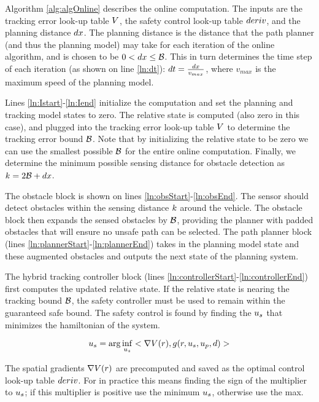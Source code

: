 Algorithm \ref{alg:algOnline} describes the online computation. The inputs are the tracking error look-up table $V$, the safety control look-up table $deriv$, and the planning distance $dx$. The planning distance is the distance that the path planner (and thus the planning model) may take for each iteration of the online algorithm, and is chosen to be $0< dx \leq \mathcal B$. This in turn determines the time step of each iteration (as shown on line \ref{ln:dt}): $dt = \frac{dx}{v_{max}}$, where $v_{max}$ is the maximum speed of the planning model.

Lines \ref{ln:Istart}-\ref{ln:Iend} initialize the computation and set the planning and tracking model states to zero. The relative state is computed (also zero in this case), and plugged into the tracking error look-up table $V$ to determine the tracking error bound $\mathcal B$. Note that by initializing the relative state to be zero we can use the smallest possible $\mathcal B$ for the entire online computation. Finally, we determine the minimum possible sensing distance for obstacle detection as $k = 2\mathcal B + dx$.

The obstacle block is shown on lines \ref{ln:obsStart}-\ref{ln:obsEnd}. The sensor should detect obstacles within the sensing distance $k$ around the vehicle. The obstacle block then expands the sensed obstacles by $\mathcal B$, providing the planner with padded obstacles that will ensure no unsafe path can be selected. The path planner block (lines \ref{ln:plannerStart}-\ref{ln:plannerEnd}) takes in the planning model state and these augmented obstacles and outputs the next state of the planning system.

The hybrid tracking controller block (lines \ref{ln:controllerStart}-\ref{ln:controllerEnd}) first computes the updated relative state. If the relative state is nearing the tracking bound $\mathcal B$, the safety controller must be used to remain within the guaranteed safe bound. The safety control is found by finding the $u_s$ that minimizes the hamiltonian of the system.

\begin{equation}
	u_s = \arg\inf_{u_s} <\nabla V(r),g(r,u_s,u_p,d)>
\end{equation}

The spatial gradients $\nabla V(r)$ are precomputed and saved as the optimal control look-up table $deriv$. For  in practice this means finding the sign of the multiplier to $u_s$; if this multiplier is positive use the minimum $u_s$, otherwise use the max.

